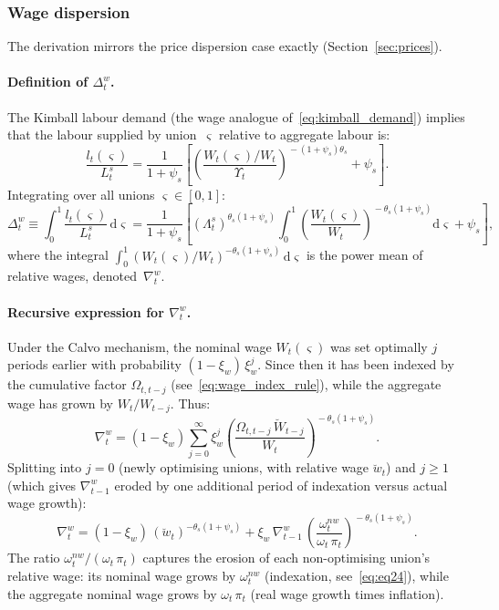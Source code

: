 \documentclass[11pt,a4paper]{article}
\newcommand{\dd}{\mathrm{d}}
\begin{document}
\subsubsection{Wage dispersion}

The derivation mirrors the price dispersion case exactly
(Section~\ref{sec:prices}).

\paragraph{Definition of $\Delta^w_t$.}
The Kimball labour demand (the wage analogue
of~\eqref{eq:kimball_demand}) implies that the labour supplied by
union~$\varsigma$ relative to aggregate labour is:
\[
  \frac{l_t(\varsigma)}{L^s_t}
  = \frac{1}{1+\psi_s}
  \left[\left(\frac{W_t(\varsigma)/W_t}{\Upsilon_t}\right)^{\!-(1+\psi_s)\theta_s}
    + \psi_s\right].
\]
Integrating over all unions $\varsigma\in[0,1]$:
\begin{equation}\label{eq:deltaw_def}
  \Delta^w_t
  \equiv \int_0^1 \frac{l_t(\varsigma)}{L^s_t}\,\dd\varsigma
  = \frac{1}{1+\psi_s}
  \left[(\Lambda^s_t)^{\theta_s(1+\psi_s)}\!
    \int_0^1
    \left(\frac{W_t(\varsigma)}{W_t}\right)^{\!-\theta_s(1+\psi_s)}
    \!\dd\varsigma
    + \psi_s\right],
\end{equation}
where the integral $\int_0^1
(W_t(\varsigma)/W_t)^{-\theta_s(1+\psi_s)}\,\dd\varsigma$ is the
power mean of relative wages, denoted~$\nabla^w_t$.

\paragraph{Recursive expression for $\nabla^w_t$.}
Under the Calvo mechanism, the nominal wage $W_t(\varsigma)$ was set
optimally $j$ periods earlier with probability
$(1-\xi_w)\,\xi_w^j$. Since then it has been indexed by the cumulative
factor $\Omega_{t,t-j}$ (see~\eqref{eq:wage_index_rule}), while the
aggregate wage has grown by $W_t/W_{t-j}$. Thus:
\[
  \nabla^w_t
  = (1-\xi_w)\sum_{j=0}^{\infty}\xi_w^j
    \left(\frac{\Omega_{t,t-j}\,\breve W_{t-j}}{W_t}\right)^{\!-\theta_s(1+\psi_s)}.
\]
Splitting into $j=0$ (newly optimising unions, with relative wage
$\breve w_t$) and $j\geq 1$ (which gives $\nabla^w_{t-1}$ eroded by
one additional period of indexation versus actual wage growth):
\begin{equation}\label{eq:eq34}\tag{Eq.~34}
  \boxed{
  \nabla^w_t = (1-\xi_w)\,(\breve w_t)^{-\theta_s(1+\psi_s)}
  + \xi_w\,\nabla^w_{t-1}\,
    \left(\frac{\omega^{nw}_t}{\omega_t\,\pi_t}\right)^{\!-\theta_s(1+\psi_s)}.}
\end{equation}
The ratio $\omega^{nw}_t/(\omega_t\,\pi_t)$ captures the erosion of
each non-optimising union's relative wage: its nominal wage grows by
$\omega^{nw}_t$ (indexation, see~\eqref{eq:eq24}), while the aggregate
nominal wage grows by $\omega_t\,\pi_t$ (real wage growth times
inflation).
\end{document}
